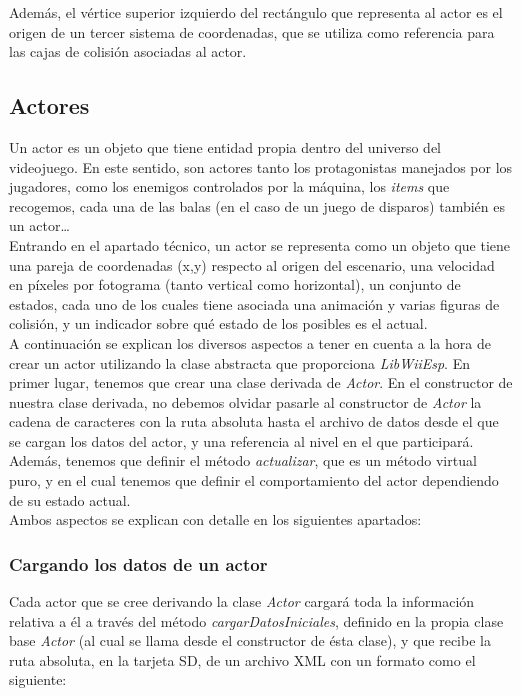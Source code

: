 Además, el vértice superior izquierdo del rectángulo que representa al actor es el origen de un tercer sistema de coordenadas, que se utiliza como referencia para las cajas de colisión asociadas al actor.

\subsection{Actores}

Un actor es un objeto que tiene entidad propia dentro del universo del videojuego. En este sentido, son actores tanto los protagonistas manejados por los jugadores, como los enemigos controlados por la máquina, los \emph{items} que recogemos, cada una de las balas (en el caso de un juego de disparos) también es un actor\ldots \\

Entrando en el apartado técnico, un actor se representa como un objeto que tiene una pareja de coordenadas (x,y) respecto al origen del escenario, una velocidad en píxeles por fotograma (tanto vertical como horizontal), un conjunto de estados, cada uno de los cuales tiene asociada una animación y varias figuras de colisión, y un indicador sobre qué estado de los posibles es el actual.\\

A continuación se explican los diversos aspectos a tener en cuenta a la hora de crear un actor utilizando la clase abstracta que proporciona \emph{LibWiiEsp}. En primer lugar, tenemos que crear una clase derivada de \emph{Actor}. En el constructor de nuestra clase derivada, no debemos olvidar pasarle al constructor de \emph{Actor} la cadena de caracteres con la ruta absoluta hasta el archivo de datos desde el que se cargan los datos del actor, y una referencia al nivel en el que participará. Además, tenemos que definir el método \emph{actualizar}, que es un método virtual puro, y en el cual tenemos que definir el comportamiento del actor dependiendo de su estado actual.\\

Ambos aspectos se explican con detalle en los siguientes apartados:

\subsubsection{Cargando los datos de un actor}

Cada actor que se cree derivando la clase \emph{Actor} cargará toda la información relativa a él a través del método \emph{cargarDatosIniciales}, definido en la propia clase base \emph{Actor} (al cual se llama desde el constructor de ésta clase), y que recibe la ruta absoluta, en la tarjeta SD, de un archivo XML con un formato como el siguiente:\\

